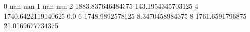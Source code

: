 0 nan nan
1 nan nan
2 1883.837646484375 143.1954345703125
4 1740.6422119140625 0.0
6 1748.9892578125 8.3470458984375
8 1761.6591796875 21.0169677734375
